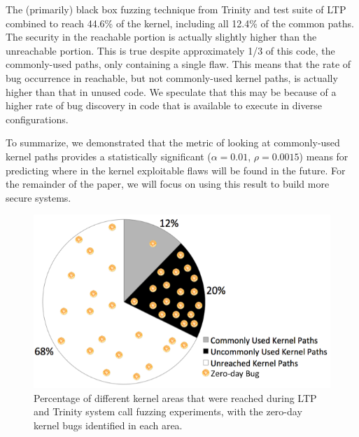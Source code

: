 The (primarily) black box fuzzing technique from Trinity and test suite of
LTP combined to reach 44.6\% of the kernel, including all 12.4\% of the common
paths.  The security in the reachable portion is actually
slightly higher than the unreachable portion. This is true despite
approximately 1/3 of this code, the commonly-used paths, only containing
a single flaw. This means that the rate of bug occurrence in reachable, but
not commonly-used kernel paths, is actually higher than that in unused
code. We speculate that this may be because of a higher rate of bug discovery
in code that is available to execute in diverse configurations.


To summarize, we demonstrated that the metric of looking at commonly-used
kernel paths provides a statistically significant ($\alpha=0.01$,
$\rho=0.0015$) means for predicting where in the kernel exploitable flaws
will be found in the future.  For the remainder of the paper, we will
focus on using this result to build more secure systems.


\begin{figure}%
\centering
\includegraphics[width=1.0\columnwidth]{diagram/kernel_coverage.png}
\caption{\small Percentage of different kernel areas that were reached during
 LTP and Trinity system call fuzzing experiments, with the zero-day kernel bugs identified
 in each area.}
\label{fig:coverage}
\end{figure}
